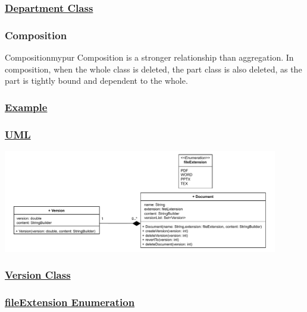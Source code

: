 \subsubsection*{\underline{Department Class}}


\subsubsection*{Composition}

\begin{prettyBox}{Composition}{mypur}
Composition is a stronger relationship than aggregation. In composition, when the whole class is deleted, the part class is also deleted, as the part is tightly bound and dependent to the whole.
\end{prettyBox}

\subsubsection*{\underline{Example}}

\subsubsection*{\underline{UML}}

\begin{center}
\includegraphics[width=0.9\textwidth]{Chapters/Diagram/OOP/EX6/ex6.drawio.pdf}
\end{center}

\subsubsection*{\underline{Version Class}}


\subsubsection*{\underline{fileExtension Enumeration}}


